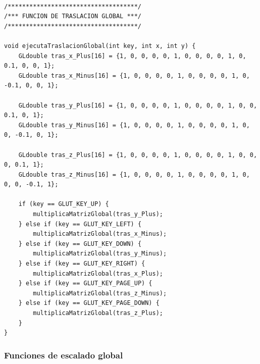 \documentclass[12pt,a4paper]{article}
\begin{document}
\begin{lstlisting}

/************************************/
/*** FUNCION DE TRASLACION GLOBAL ***/
/************************************/

void ejecutaTraslacionGlobal(int key, int x, int y) {
    GLdouble tras_x_Plus[16] = {1, 0, 0, 0, 0, 1, 0, 0, 0, 0, 1, 0, 0.1, 0, 0, 1};
    GLdouble tras_x_Minus[16] = {1, 0, 0, 0, 0, 1, 0, 0, 0, 0, 1, 0, -0.1, 0, 0, 1};

    GLdouble tras_y_Plus[16] = {1, 0, 0, 0, 0, 1, 0, 0, 0, 0, 1, 0, 0, 0.1, 0, 1};
    GLdouble tras_y_Minus[16] = {1, 0, 0, 0, 0, 1, 0, 0, 0, 0, 1, 0, 0, -0.1, 0, 1};

    GLdouble tras_z_Plus[16] = {1, 0, 0, 0, 0, 1, 0, 0, 0, 0, 1, 0, 0, 0, 0.1, 1};
    GLdouble tras_z_Minus[16] = {1, 0, 0, 0, 0, 1, 0, 0, 0, 0, 1, 0, 0, 0, -0.1, 1};

    if (key == GLUT_KEY_UP) {
        multiplicaMatrizGlobal(tras_y_Plus);
    } else if (key == GLUT_KEY_LEFT) {
        multiplicaMatrizGlobal(tras_x_Minus);
    } else if (key == GLUT_KEY_DOWN) {
        multiplicaMatrizGlobal(tras_y_Minus);
    } else if (key == GLUT_KEY_RIGHT) {
        multiplicaMatrizGlobal(tras_x_Plus);
    } else if (key == GLUT_KEY_PAGE_UP) {
        multiplicaMatrizGlobal(tras_z_Minus);
    } else if (key == GLUT_KEY_PAGE_DOWN) {
        multiplicaMatrizGlobal(tras_z_Plus);
    }
}

\end{lstlisting}

\subsubsection{Funciones de escalado global}
\end{document}
